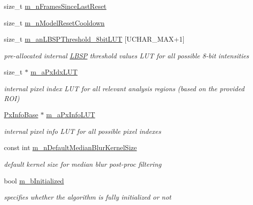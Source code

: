 \begin{DoxyCompactItemize}
size\+\_\+t \mbox{\hyperlink{class_background_subtractor_l_b_s_p_ab56bf775dfdf0579e834e45210c3a92a}{m\+\_\+n\+Frames\+Since\+Last\+Reset}}
\item 
size\+\_\+t \mbox{\hyperlink{class_background_subtractor_l_b_s_p_a5ea18d388afacf8285c46ba0f754e7ee}{m\+\_\+n\+Model\+Reset\+Cooldown}}
\item 
size\+\_\+t \mbox{\hyperlink{class_background_subtractor_l_b_s_p_aefe69d94f08b2c4ba73ad1d254ad9153}{m\+\_\+an\+L\+B\+S\+P\+Threshold\+\_\+8bit\+L\+UT}} \mbox{[}U\+C\+H\+A\+R\+\_\+\+M\+AX+1\mbox{]}
\begin{DoxyCompactList}\small\item\em pre-\/allocated internal \mbox{\hyperlink{class_l_b_s_p}{L\+B\+SP}} threshold values L\+UT for all possible 8-\/bit intensities \end{DoxyCompactList}\item 
size\+\_\+t $\ast$ \mbox{\hyperlink{class_background_subtractor_l_b_s_p_a06b4f0d3f24fa08bccd3c9eca085713e}{m\+\_\+a\+Px\+Idx\+L\+UT}}
\begin{DoxyCompactList}\small\item\em internal pixel index L\+UT for all relevant analysis regions (based on the provided R\+OI) \end{DoxyCompactList}\item 
\mbox{\hyperlink{struct_background_subtractor_l_b_s_p_1_1_px_info_base}{Px\+Info\+Base}} $\ast$ \mbox{\hyperlink{class_background_subtractor_l_b_s_p_a74e73d4832ccdef652d93756582024db}{m\+\_\+a\+Px\+Info\+L\+UT}}
\begin{DoxyCompactList}\small\item\em internal pixel info L\+UT for all possible pixel indexes \end{DoxyCompactList}\item 
const int \mbox{\hyperlink{class_background_subtractor_l_b_s_p_a2585fe6e41e10af6da3e325dc20fe7f1}{m\+\_\+n\+Default\+Median\+Blur\+Kernel\+Size}}
\begin{DoxyCompactList}\small\item\em default kernel size for median blur post-\/proc filtering \end{DoxyCompactList}\item 
bool \mbox{\hyperlink{class_background_subtractor_l_b_s_p_a55cea104a0924fd50d5bed0912828a7e}{m\+\_\+b\+Initialized}}
\begin{DoxyCompactList}\small\item\em specifies whether the algorithm is fully initialized or not \end{DoxyCompactList}\item 

\end{DoxyCompactItemize}
